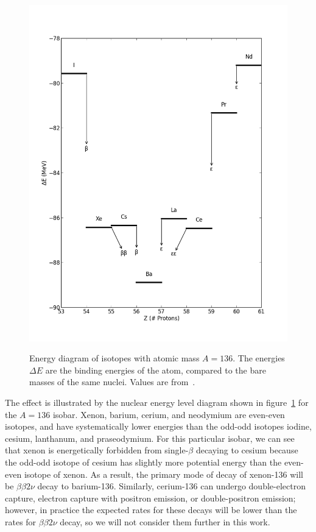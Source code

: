 \begin{figure}
\begin{center}
\includegraphics[keepaspectratio=true,width=\textwidth]{scripts/LevelDiagram.png}
\end{center}
\renewcommand{\baselinestretch}{1}
\small\normalsize
\begin{quote}
\caption{Energy diagram of isotopes with atomic mass $A=136$.  The energies $\Delta E$ are the binding energies of the atom, compared to the bare masses of the same nuclei.  Values are from~\cite{AtomicMassEvaluation}.}
\label{fig:LevelDiagram}
\end{quote}
\end{figure}
\renewcommand{\baselinestretch}{2}
\small\normalsize

The effect is illustrated by the nuclear energy level diagram shown in figure~\ref{fig:LevelDiagram} for the $A=136$ isobar. Xenon, barium, cerium, and neodymium are even-even isotopes, and have systematically lower energies than the odd-odd isotopes iodine, cesium, lanthanum, and praseodymium.  For this particular isobar, we can see that xenon is energetically forbidden from single-$\beta$ decaying to cesium because the odd-odd isotope of cesium has slightly more potential energy than the even-even isotope of xenon. As a result, the primary mode of decay of xenon-136 will be $\beta\beta 2\nu$ decay to barium-136.  Similarly, cerium-136 can undergo double-electron capture, electron capture with positron emission, or double-positron emission; however, in practice the expected rates for these decays will be lower than the rates for $\beta\beta 2\nu$ decay, so we will not consider them further in this work.

